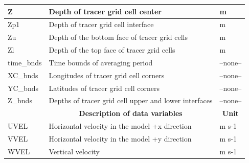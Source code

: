 \begin{longtable}{|m{}|m{}|m{}|}
Z &Depth of tracer grid cell center &m  \\ \hline
Zp1 &Depth of tracer grid cell interface &m  \\ \hline
Zu &Depth of the bottom face of tracer grid cells &m  \\ \hline
Zl &Depth of the top face of tracer grid cells &m  \\ \hline
time\_bnds &Time bounds of averaging period &--none--  \\ \hline
XC\_bnds &Longitudes of tracer grid cell corners &--none--  \\ \hline
YC\_bnds &Latitudes of tracer grid cell corners &--none--  \\ \hline
Z\_bnds &Depths of tracer grid cell upper and lower interfaces &--none--  \\ \hline
\rowcolor{lightgray} \multicolumn{1}{|c|}{\textbf{Variables}} & \multicolumn{1}{|c|}{\textbf{Description of data variables}} &  \multicolumn{1}{|c|}{\textbf{Unit}}\\ \hline
UVEL &Horizontal velocity in the model +x direction &m s-1  \\ \hline
VVEL &Horizontal velocity in the model +y direction &m s-1  \\ \hline
WVEL &Vertical velocity &m s-1  \\ \hline
\end{longtable}

\newp
\pagebreak

